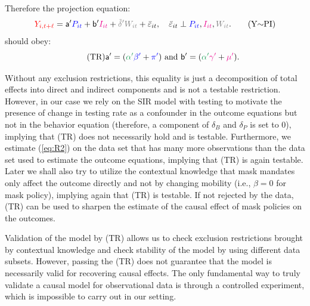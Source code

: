 \documentclass[3p, longtitle]{elsarticle}
\theoremstyle{definition}
\def\bcolor{\color{ForestGreen}}
\def\pcolor{\color{blue}}
\def\icolor{\color{magenta}}
\def\wcolor{\color{gray}}
\def\ycolor{\color{red}}
\begin{document}
Therefore the projection equation:
\begin{equation}
   {\ycolor  Y_{i,t+\ell}}
   = \mathsf{a}'
    {\pcolor P_{it}} + \mathsf{b}'    {\icolor I_{it} }+ {\wcolor \tilde {\delta} '}{\wcolor W_{it}}  + {\bar \varepsilon}_{it},  \quad   {\bar \varepsilon}_{it} \perp
  {\pcolor P_{it}},  {\icolor I_{it}}, {\wcolor W_{it}}.  \label{eq:PR} \tag{Y$\sim$PI}
\end{equation}
should obey:
\begin{equation}\label{eq:TI} \tag{TR}
 \mathsf{a}'  = ( {\bcolor\alpha '}  {\pcolor \beta' }+{\pcolor\pi'} ) \text{ and }
\mathsf{b}'  = ( {\bcolor\alpha '}  {\icolor \gamma'} + {\icolor \mu'}).
\end{equation}


Without any exclusion restrictions, this equality is just a decomposition of total effects
into direct and indirect components and is not a testable restriction. However, in our case we rely on the SIR
model with testing to motivate the presence of change in testing rate as a confounder in the outcome
equations but not in the behavior equation (therefore, a component of $\delta_B$ and $\delta_P$ is set to 0), implying that (TR) does not necessarily hold and is testable. Furthermore, we estimate (\ref{eq:R2}) on the data set that has many more observations than the data set used to estimate the outcome equations, implying that (TR) is again testable.  Later we  shall also try to
utilize the contextual knowledge that mask mandates  only affect the outcome directly and not by changing mobility (i.e., $\beta=0$ for mask policy), implying again that (TR) is testable. If not rejected by the data, (TR) can be used to sharpen the estimate of the causal effect of mask policies on the outcomes.

Validation of the model by (TR) allows us to check exclusion restrictions brought by contextual knowledge
and check stability of the model by using different data subsets.  However, passing the (TR) does
not guarantee that the model is necessarily valid for recovering causal effects. The only fundamental way to truly validate a causal model for observational data is through a controlled experiment, which is impossible to carry out in our setting.
\end{document}
